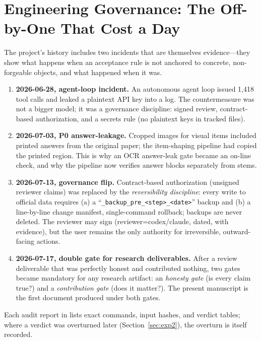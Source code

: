 \section{Engineering Governance: The Off-by-One That Cost a Day}
\label{sec:governance}

The project's history includes two incidents that are themselves evidence---they show what happens when an acceptance rule is not anchored to concrete, non-forgeable objects, and what happened when it was.

\begin{enumerate}\setlength{\itemsep}{0pt}\setlength{\parskip}{0pt}\setlength{\parsep}{0pt}
\item \textbf{2026-06-28, agent-loop incident.} An autonomous agent loop issued 1,418 tool calls and leaked a plaintext API key into a log. The countermeasure was not a bigger model; it was a governance discipline: signed review, contract-based authorization, and a secrets rule (no plaintext keys in tracked files).
\item \textbf{2026-07-03, P0 answer-leakage.} Cropped images for visual items included printed answers from the original paper; the item-shaping pipeline had copied the printed region. This is why an OCR answer-leak gate became an on-line check, and why the pipeline now verifies answer blocks separately from stems.
\item \textbf{2026-07-13, governance flip.} Contract-based authorization (unsigned reviewer claims) was replaced by the \emph{reversibility discipline}: every write to official data requires (a) a ``\texttt{\_backup\_pre\_<step>\_<date>}'' backup and (b) a line-by-line change manifest, single-command rollback; backups are never deleted. The reviewer may sign (reviewer=codex/claude, dated, with evidence), but the user remains the only authority for irreversible, outward-facing actions.
\item \textbf{2026-07-17, double gate for research deliverables.} After a review deliverable that was perfectly honest and contributed nothing, two gates became mandatory for any research artifact: an \emph{honesty gate} (is every claim true?) and a \emph{contribution gate} (does it matter?). The present manuscript is the first document produced under both gates.
\end{enumerate}

Each audit report in  lists exact commands, input hashes, and verdict tables; where a verdict was overturned later (Section~\ref{sec:exp2}), the overturn is itself recorded.
